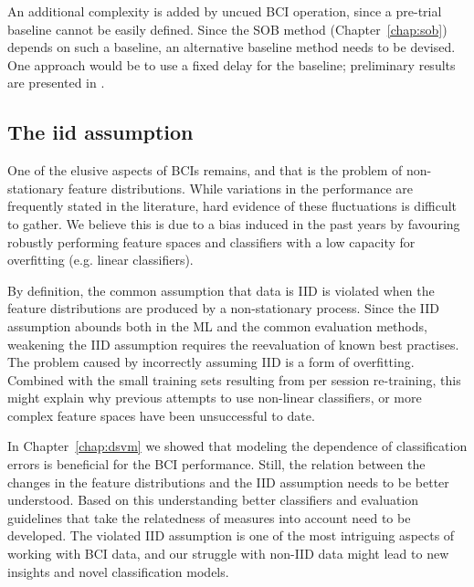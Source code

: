 An additional complexity is added by uncued \ac{BCI} operation, since a
pre-trial baseline cannot be easily defined. Since the \ac{SOB} method
(Chapter~\ref{chap:sob}) depends on such a baseline, an alternative baseline
method needs to be devised. One approach would be to use a fixed delay for the
baseline; preliminary results are presented in \cite{reuderink2010sss}.


\subsection{The iid assumption}
One of the elusive aspects of \acp{BCI} remains, and that is the problem of
non-stationary feature distributions. While variations in the performance are
frequently stated in the literature, hard evidence of these fluctuations is
difficult to gather. We believe this is due to a bias induced in the
past years by favouring robustly performing feature spaces and classifiers with
a low capacity for overfitting (e.g. linear classifiers).

By definition, the common assumption that data is \ac{IID} is violated when the
feature distributions are produced by a non-stationary process. Since the
\ac{IID} assumption abounds both in the \ac{ML} and the common evaluation
methods, weakening the \ac{IID} assumption requires the reevaluation of known
best practises. The problem caused by incorrectly assuming \ac{IID} is a form
of overfitting. Combined with the small training sets resulting from per
session re-training, this might explain why previous attempts to use non-linear
classifiers, or more complex feature spaces have been unsuccessful to date.

In Chapter~\ref{chap:dsvm} we showed that modeling the dependence of
classification errors is beneficial for the \ac{BCI} performance. Still, the
relation between the changes in the feature distributions and the \ac{IID}
assumption needs to be better understood. Based on this understanding better
classifiers and evaluation guidelines that take the relatedness of measures
into account need to be developed.
%
The violated \ac{IID} assumption is one of the most intriguing aspects of
working with \ac{BCI} data, and our struggle with non-\ac{IID} data might lead
to new insights and novel classification models. 
